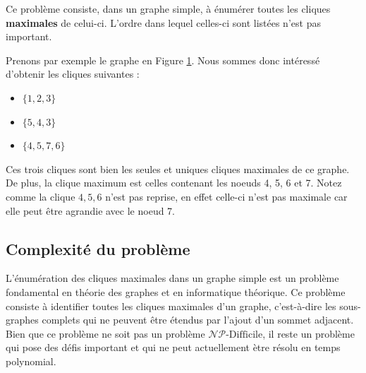 \documentclass[12pt,a4paper]{article}
\begin{document}
Ce problème consiste, dans un graphe simple, à énumérer toutes les cliques \textbf{maximales} de celui-ci. L'ordre dans lequel celles-ci sont listées n'est pas important.

\begin{figure}[h]
  \begin{center}
    \caption{}
    \label{fig:x clique3}
  \end{center}
\end{figure}


Prenons par exemple le graphe en Figure \ref{fig:x clique3}. Nous sommes donc intéressé d'obtenir les cliques suivantes :
\begin{itemize}
        \item \(\{1, 2, 3\}\)
        \item \(\{5, 4, 3\}\)
        \item \(\{4, 5, 7, 6\}\)
\end{itemize}
Ces trois cliques sont bien les seules et uniques cliques maximales de ce graphe. De plus, la clique maximum est celles contenant les noeuds 4, 5, 6 et 7.
Notez comme la clique \({4, 5, 6}\) n'est pas reprise, en effet celle-ci n'est pas maximale car elle peut être agrandie avec le noeud 7.

\subsection{Complexité du problème}
L'énumération des cliques maximales dans un graphe simple est un problème fondamental en théorie des graphes et en informatique théorique. Ce problème consiste à identifier toutes les cliques maximales d'un graphe, c'est-à-dire les sous-graphes complets qui ne peuvent être étendus par l'ajout d'un sommet adjacent. Bien que ce problème ne soit pas un problème \(\mathcal{N}\mathcal{P}\text{-Difficile}\), il reste un problème qui pose des défis important et qui ne peut actuellement ètre résolu en temps polynomial.
\end{document}
